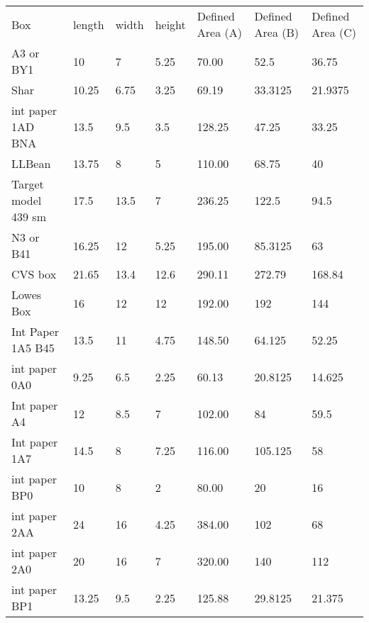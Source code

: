 \documentclass[11pt, twoside, reqno]{book}
\begin{document}
\begin{table}[]
	\centering
	
	\label{my-label}
	\begin{tabular}{lllllll}
		Box                 & length & width & height & Defined Area (A) & Defined Area (B) & Defined Area (C) \\
		A3 or BY1           & 10     & 7     & 5.25   & 70.00            & 52.5             & 36.75            \\
		Shar                & 10.25  & 6.75  & 3.25   & 69.19            & 33.3125          & 21.9375          \\
		int paper 1AD BNA   & 13.5   & 9.5   & 3.5    & 128.25           & 47.25            & 33.25            \\
		LLBean              & 13.75  & 8     & 5      & 110.00           & 68.75            & 40               \\
		Target model 439 sm & 17.5   & 13.5  & 7      & 236.25           & 122.5            & 94.5             \\
		N3 or B41           & 16.25  & 12    & 5.25   & 195.00           & 85.3125          & 63               \\
		CVS box             & 21.65  & 13.4  & 12.6   & 290.11           & 272.79           & 168.84           \\
		Lowes Box           & 16     & 12    & 12     & 192.00           & 192              & 144              \\
		Int Paper 1A5 B45   & 13.5   & 11    & 4.75   & 148.50           & 64.125           & 52.25            \\
		int paper 0A0       & 9.25   & 6.5   & 2.25   & 60.13            & 20.8125          & 14.625           \\
		Int paper A4        & 12     & 8.5   & 7      & 102.00           & 84               & 59.5             \\
		Int paper 1A7       & 14.5   & 8     & 7.25   & 116.00           & 105.125          & 58               \\
		int paper BP0       & 10     & 8     & 2      & 80.00            & 20               & 16               \\
		int paper 2AA       & 24     & 16    & 4.25   & 384.00           & 102              & 68               \\
		int paper 2A0       & 20     & 16    & 7      & 320.00           & 140              & 112              \\
		int paper BP1       & 13.25  & 9.5   & 2.25   & 125.88           & 29.8125          & 21.375           \\

\end{tabular}
\end{table}
\end{document}
